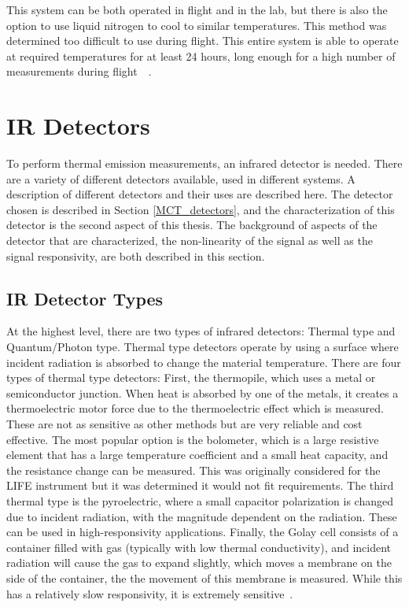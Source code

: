 This system can be both operated in flight and in the lab, but there is also the option to use liquid nitrogen to cool to similar temperatures. This method was determined too difficult to use during flight. This entire system is able to operate at required temperatures for at least 24 hours, long enough for a high number of measurements during flight~\citep{GLORIA_concept}~\citep{GLORIA_thermalmech}.

\section{IR Detectors}\label{IR_detector_bg_sec}
To perform thermal emission measurements, an infrared detector is needed. There are a variety of different detectors available, used in different systems. A description of different detectors and their uses are described here. The detector chosen is described in Section \ref{MCT_detectors}, and the characterization of this detector is the second aspect of this thesis. The background of aspects of the detector that are characterized, the non-linearity of the signal as well as the signal responsivity, are both described in this section.

\subsection{IR Detector Types}\label{IR_detector_types}
At the highest level, there are two types of infrared detectors: Thermal type and Quantum/Photon type. Thermal type detectors operate by using a surface where incident radiation is absorbed to change the material temperature. There are four types of thermal type detectors: First, the thermopile, which uses a metal or semiconductor junction. When heat is absorbed by one of the metals, it creates a thermoelectric motor force due to the thermoelectric effect which is measured. These are not as sensitive as other methods but are very reliable and cost effective. The most popular option is the bolometer, which is a large resistive element that has a large temperature coefficient and a small heat capacity, and the resistance change can be measured. This was originally considered for the LIFE instrument but it was determined it would not fit requirements. The third thermal type is the pyroelectric, where a small capacitor polarization is changed due to incident radiation, with the magnitude dependent on the radiation. These can be used in high-responsivity applications. Finally, the Golay cell consists of a container filled with gas (typically with low thermal conductivity), and incident radiation will cause the gas to expand slightly, which moves a membrane on the side of the container, the the movement of this membrane is measured. While this has a relatively slow responsivity, it is extremely sensitive~\citep{IR_detector_textbook}.

